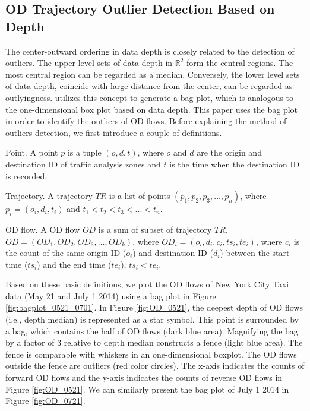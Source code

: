 \documentclass[a4paper,UKenglish]{lipics-v2016}
\begin{document}
\subsection{OD Trajectory Outlier Detection Based on Depth}
The center-outward ordering in data depth is closely related to the detection of outliers. The upper level sets of data depth in $\mathbb{R}^2$ form the central regions. The most central region can be regarded as a median. Conversely, the lower level sets of data depth, coincide with large distance from the center, can be regarded as outlyingness. \cite{rousseeuw99AS,aplpackR} utilizes this concept to generate a bag plot, which is analogous to the one-dimensional box plot based on data depth. This paper uses the bag plot in order to identify the outliers of OD flows. Before explaining the method of outliers detection, we first introduce a couple of definitions.

\begin{definition}{Point.}
	A point $p$ is a tuple $(o,d,t)$, where $o$ and $d$  are the origin and destination ID of traffic analysis zones and $t$ is the time when the destination ID is recorded.
\end{definition}


\begin{definition}{Trajectory.}
	A trajectory $TR$ is a list of points $(p_1, p_2, p_3,...,p_n)$, where $p_i = (o_i,d_i,t_i)$ and $t_1<t_2<t_3<...<t_n$.
\end{definition}

\begin{definition}{OD flow.}
	A OD flow $OD$ is a sum of subset of trajectory $TR$. $OD = (OD_1, OD_2, OD_3,...,OD_k)$, where $OD_i = (o_i,d_i,c_i,ts_i, te_i)$, where $c_i$ is the count of the same origin ID ($o_i$) and destination ID ($d_i$) between the start time ($ts_i$) and the end time ($te_i$), $ts_i<te_i$.
\end{definition}

Based on these basic definitions, we plot the OD flows of New York City Taxi data (May 21 and July 1 2014) using a bag plot in Figure \ref{fig:bagplot_0521_0701}. In Figure \ref{fig:OD_0521}, the deepest depth of OD flows (i.e., depth median) is represented as a star symbol. This point is surrounded by a bag, which contains the half of OD flows (dark blue area). Magnifying the bag by a factor of 3 relative to depth median constructs a fence (light blue area). The fence is comparable with whiskers in an one-dimensional boxplot. The OD flows outside the fence are outliers (red color circles). The x-axis indicates the counts of forward OD flows and the y-axis indicates  the counts of reverse OD flows in Figure \ref{fig:OD_0521}. We can similarly present the bag plot of July 1 2014 in Figure \ref{fig:OD_0721}.
\end{document}
